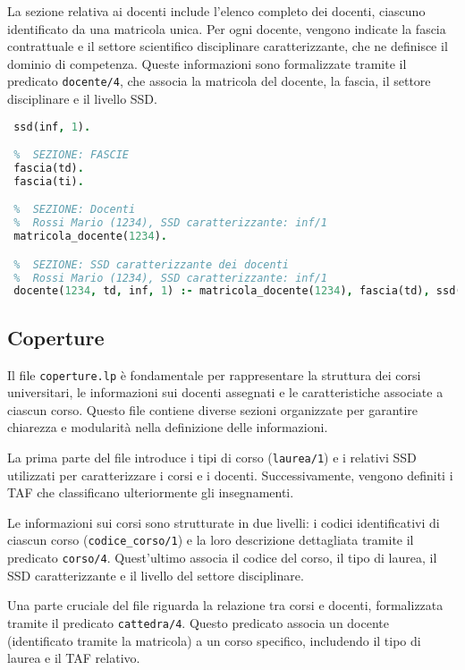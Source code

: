 La sezione relativa ai docenti include l'elenco completo dei docenti, ciascuno 
identificato da una matricola unica. Per ogni docente, vengono indicate la fascia 
contrattuale e il settore scientifico disciplinare caratterizzante, che ne 
definisce il dominio di competenza. Queste informazioni sono formalizzate tramite 
il predicato \texttt{docente/4}, che associa la matricola del docente, la fascia, 
il settore disciplinare e il livello SSD.

\begin{lstlisting}[language=prolog, caption={Esempio struttura dati di \texttt{docenti.lp}.}]    
 %  SEZIONE: SSD
 ssd(inf, 1).

 %  SEZIONE: FASCIE
 fascia(td).
 fascia(ti).

 %  SEZIONE: Docenti
 %  Rossi Mario (1234), SSD caratterizzante: inf/1
 matricola_docente(1234).

 %  SEZIONE: SSD caratterizzante dei docenti
 %  Rossi Mario (1234), SSD caratterizzante: inf/1
 docente(1234, td, inf, 1) :- matricola_docente(1234), fascia(td), ssd(inf, 1).
\end{lstlisting}


\subsection{Coperture}\label{sec:rules-coperture}
Il file \texttt{coperture.lp} è fondamentale per rappresentare la struttura dei 
corsi universitari, le informazioni sui docenti assegnati e le caratteristiche 
associate a ciascun corso. Questo file contiene diverse sezioni organizzate per 
garantire chiarezza e modularità nella definizione delle informazioni.

La prima parte del file introduce i tipi di corso (\texttt{laurea/1}) e i relativi 
SSD utilizzati per caratterizzare i corsi e i docenti. Successivamente, vengono 
definiti i TAF che classificano ulteriormente gli insegnamenti.

Le informazioni sui corsi sono strutturate in due livelli: i codici identificativi 
di ciascun corso (\texttt{codice\_corso/1}) e la loro descrizione dettagliata 
tramite il predicato \texttt{corso/4}. Quest'ultimo associa il codice del corso, 
il tipo di laurea, il SSD caratterizzante e il livello del settore disciplinare.

Una parte cruciale del file riguarda la relazione tra corsi e docenti, formalizzata 
tramite il predicato \texttt{cattedra/4}. Questo predicato associa un docente 
(identificato tramite la matricola) a un corso specifico, includendo il tipo di 
laurea e il TAF relativo. 

